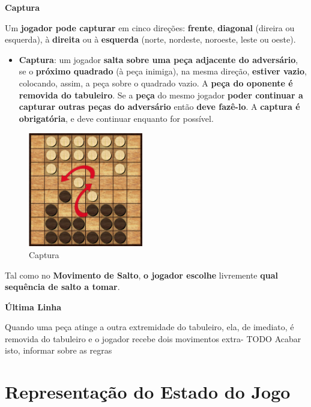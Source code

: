 \documentclass[a4paper]{article}
\begin{document}
\large{\textbf{Captura}}
\begin{small}

Um \textbf{jogador pode capturar} em cinco direções: \textbf{frente}, \textbf{diagonal} (direira ou esquerda), à \textbf{direita} ou à \textbf{esquerda} (norte, nordeste, noroeste, leste ou oeste). 

\begin{itemize}
\item \textbf{Captura}:
um jogador \textbf{salta sobre uma peça adjacente do adversário}, se o \textbf{próximo quadrado} (à peça inimiga), na mesma direção, \textbf{estiver vazio}, colocando, assim, a peça sobre o quadrado vazio. A \textbf{peça do oponente é removida do tabuleiro}. Se a \textbf{peça} do mesmo jogador \textbf{poder continuar a capturar outras peças do adversário} então \textbf{deve fazê-lo}. A \textbf{captura é obrigatória}, e deve continuar enquanto for possível.
\end{itemize}

\begin{figure}[h!]
	\centering
    \includegraphics[height=5cm,width=5cm]{res/captureMove.png}
    \caption{Captura}
    \label{fig:7}
\end{figure}

Tal como no \textbf{Movimento de Salto}, \textbf{o jogador escolhe} livremente \textbf{qual sequência de salto a tomar}.
\end{small}\newline

\large{\textbf{Última Linha}}
\begin{small}

Quando uma peça atinge a outra extremidade do tabuleiro, ela, de imediato, é removida do tabuleiro e o jogador recebe dois movimentos extra- TODO Acabar isto, informar sobre as regras
\end{small}\newline

\section{Representação do Estado do Jogo}
\end{document}
